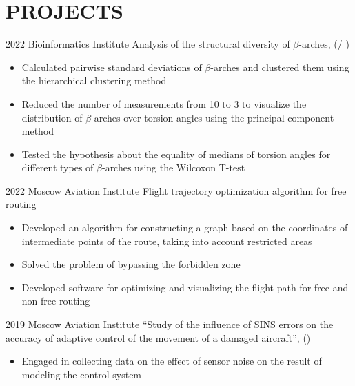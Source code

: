 \section{PROJECTS}

    \project
    {2022}
    {Bioinformatics Institute}
    {Analysis of the structural diversity of $\beta$-arches, 
    (/%
    )}
    {
        \begin{itemize}
            \setlength\itemsep{-.5em}
            \item Calculated pairwise standard deviations of $\beta$-arches and clustered them using the hierarchical clustering method
            \item Reduced the number of measurements from 10 to 3 to visualize the distribution of $\beta$-arches over torsion angles using the principal component method
            \item Tested the hypothesis about the equality of medians of torsion angles for different types of $\beta$-arches using the Wilcoxon T-test
        \end{itemize}
    }
    
    \project
    {2022}
    {Moscow Aviation Institute}
    {Flight trajectory optimization algorithm for free routing}
    {
        \begin{itemize}
            \setlength\itemsep{-.5em}
            \item Developed an algorithm for constructing a graph based on the coordinates of intermediate points of the route, taking into account restricted areas
            \item Solved the problem of bypassing the forbidden zone
            \item Developed software for optimizing and visualizing the flight path for free and non-free routing
        \end{itemize}
    }
    
    \project
    {2019}
    {Moscow Aviation Institute}
    {“Study of the influence of SINS errors on the accuracy of adaptive control of the movement of a damaged aircraft”, 
    ()}
    {
        \begin{itemize}
            \setlength\itemsep{-.5em}
            \item Engaged in collecting data on the effect of sensor noise on the result of modeling the control system
        \end{itemize}
    }

